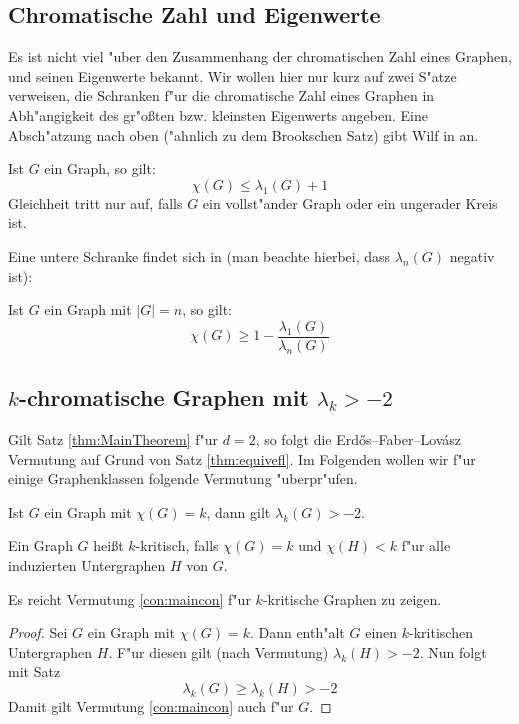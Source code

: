 \subsection{Chromatische Zahl und Eigenwerte}
Es ist nicht viel "uber den Zusammenhang der chromatischen Zahl eines Graphen, und seinen Eigenwerte bekannt. Wir wollen hier nur kurz auf zwei S"atze verweisen, die Schranken f"ur die chromatische Zahl eines Graphen in Abh"angigkeit des gr"o{\ss}ten bzw. kleinsten Eigenwerts angeben. Eine Absch"atzung nach oben ("ahnlich zu dem Brookschen Satz) gibt Wilf in \cite{wilf1967eigenvalues} an.

\begin{theorem}
  Ist $G$ ein Graph, so gilt: 
  $$\chi(G) \leq \lambda_{1}(G) +1$$
  Gleichheit tritt nur auf, falls $G$ ein vollst"ander Graph oder ein ungerader Kreis ist.
  \label{thm:wilfev}
\end{theorem}

Eine untere Schranke findet sich in \cite{Hoffmanbounds} (man beachte hierbei, dass $\lambda_{n}(G)$ negativ ist):

\begin{theorem}
  Ist $G$ ein Graph mit $|G| = n$, so gilt:
  $$\chi(G) \geq 1 - \frac{\lambda_{1}(G)}{\lambda_{n}(G)}$$
  \label{thm:Hoffmanev}
\end{theorem}

\subsection{$k$-chromatische Graphen mit $\lambda_{k} > -2$}

Gilt Satz \ref{thm:MainTheorem} f"ur $d=2$, so folgt die Erd\H{o}s--Faber--Lov\'asz Vermutung auf Grund von Satz \ref{thm:equivefl}. Im Folgenden wollen wir f"ur einige Graphenklassen folgende Vermutung "uberpr"ufen.
\begin{conjecture}
  Ist $G$ ein Graph mit $\chi(G) = k$, dann gilt $\lambda_{k}(G) > -2$. 
  \label{con:maincon}
\end{conjecture}

Ein Graph $G$ hei{\ss}t $k$-kritisch, falls $\chi(G) = k$ und $\chi(H) < k$ f"ur alle induzierten Untergraphen $H$ von $G$.
\begin{remark}
  Es reicht Vermutung \ref{con:maincon} f"ur $k$-kritische Graphen zu zeigen. 
\end{remark}

\begin{proof}
  Sei $G$ ein Graph mit $\chi(G) = k$. Dann enth"alt $G$ einen $k$-kritischen Untergraphen $H$. F"ur diesen gilt (nach Vermutung) $\lambda_{k}(H) > -2$. Nun folgt mit Satz 
  \begin{equation*}
    \lambda_{k}(G) \geq \lambda_{k}(H) > -2
  \end{equation*}
  Damit gilt Vermutung \ref{con:maincon} auch f"ur $G$.
\end{proof}

